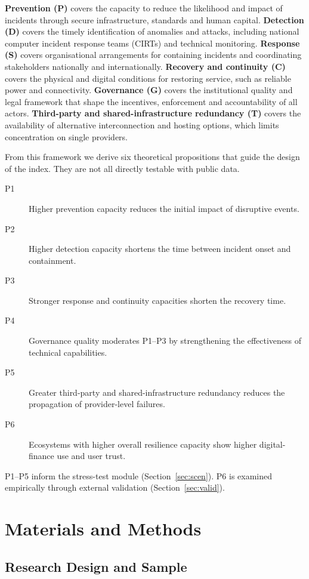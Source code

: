 \documentclass[11pt,a4paper]{article}
\begin{document}
\textbf{Prevention (P)} covers the capacity to reduce the likelihood and impact of incidents through secure infrastructure, standards and human capital. \textbf{Detection (D)} covers the timely identification of anomalies and attacks, including national computer incident response teams (CIRTs) and technical monitoring. \textbf{Response (S)} covers organisational arrangements for containing incidents and coordinating stakeholders nationally and internationally. \textbf{Recovery and continuity (C)} covers the physical and digital conditions for restoring service, such as reliable power and connectivity. \textbf{Governance (G)} covers the institutional quality and legal framework that shape the incentives, enforcement and accountability of all actors. \textbf{Third-party and shared-infrastructure redundancy (T)} covers the availability of alternative interconnection and hosting options, which limits concentration on single providers.

From this framework we derive six theoretical propositions that guide the design of the index. They are not all directly testable with public data.
\begin{description}
 \item[P1] Higher prevention capacity reduces the initial impact of disruptive events.
 \item[P2] Higher detection capacity shortens the time between incident onset and containment.
 \item[P3] Stronger response and continuity capacities shorten the recovery time.
 \item[P4] Governance quality moderates P1--P3 by strengthening the effectiveness of technical capabilities.
 \item[P5] Greater third-party and shared-infrastructure redundancy reduces the propagation of provider-level failures.
 \item[P6] Ecosystems with higher overall resilience capacity show higher digital-finance use and user trust.
\end{description}
P1--P5 inform the stress-test module (Section~\ref{sec:scen}). P6 is examined empirically through external validation (Section~\ref{sec:valid}).

\section{Materials and Methods}\label{sec:methods}

\subsection{Research Design and Sample}
\end{document}
